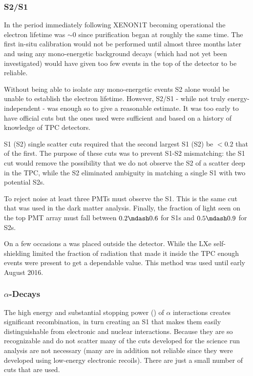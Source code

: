 \subsubsection{S2/S1}
\label{subsubsec:electron_lifetimes_measurement_ss}
In the period immediately following XENON1T becoming operational the electron lifetime was ${\sim} 0$ since purification began at roughly
the same time.  The first in-situ calibration would not be performed until almost three months later and using any mono-energetic
background decays (which had not yet been investigated) would have given too few events in the top of the detector to be reliable.

Without being able to isolate any mono-energetic events S2 alone would be unable to establish the electron lifetime.  However,
S2/S1 - while not truly energy-independent - was enough so to give a reasonable estimate.  It was too early to have official cuts but
the ones used were sufficient and based on a history of knowledge of TPC detectors.

S1 (S2) single scatter cuts required that the second largest S1 (S2) be $< 0.2$ that of the first.  The purpose of these cuts was to
prevent S1-S2 mismatching: the S1 cut would
remove the possibility that we do not observe the S2 of a scatter deep in the TPC, while the S2 eliminated ambiguity in matching a single
S1 with two potential S2s.

To reject noise at least three PMTs must observe the S1.  This is the same cut that was used in the dark matter analysis.  Finally, the
fraction of light seen on the top PMT array must fall between $0.2 \mdash 0.6$ for S1s and $0.5 \mdash 0.9$ for S2s.

On a few occasions a  was placed outside the detector.  While the LXe self-shielding limited the fraction of radiation that
made it inside the TPC enough events were present to get a dependable value.  This method was used until early August 2016.



\subsubsection{$\alpha$-Decays}
\label{subsubsec:electron_lifetimes_measurement_alphas}
The high energy and substantial stopping power () of $\alpha$ interactions creates significant
recombination, in turn creating an S1 that makes them easily distinguishable from electronic and nuclear
interactions.  Because they are so recognizable and do not scatter many of the cuts developed for the science run analysis are not
necessary (many are in addition not reliable since they were developed using low-energy electronic recoils).  There are just a small
number of cuts that are used.

